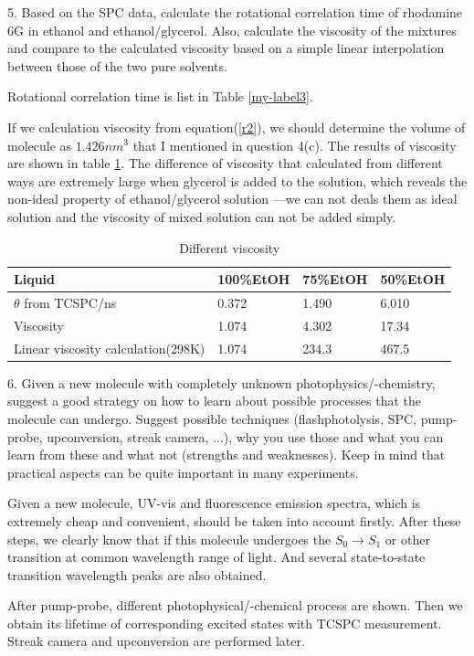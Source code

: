 \documentclass{article}
\begin{document}
5. Based on the SPC data, calculate the rotational correlation time of rhodamine 6G in ethanol and
ethanol/glycerol. Also, calculate the viscosity of the mixtures and compare to the calculated viscosity based on a simple linear interpolation between those of the two pure solvents. \\ \par
Rotational correlation time is list in Table \ref{my-label3}. \par 
If we calculation viscosity from equation(\ref{r2}), we should determine the volume of molecule as $1.426 nm^3$ that I mentioned in question 4(c). The results of viscosity are shown in table 
\ref{my-label4}. The difference of viscosity that calculated from different ways are extremely large when glycerol is added to the solution, which reveals the non-ideal property of ethanol/glycerol solution ---we can not deals them as ideal solution and the viscosity of mixed solution can not be added simply. \\ \par

\begin{table}
\centering
\caption{Different viscosity}
\label{my-label4}
\begin{tabular}{@{}llll@{}}
\toprule
Liquid & 100\%EtOH & 75\%EtOH &50\%EtOH\\ \midrule
$\theta$ from TCSPC/ns  & 0.372 & 1.490 &6.010\\ 
Viscosity  & 1.074 & 4.302 &17.34\\ 
Linear viscosity calculation(298K)  & 1.074 & 234.3 &467.5\\ 
\bottomrule
\end{tabular}
\end{table}


6.  Given a new molecule with completely unknown photophysics/-chemistry, suggest a good strategy on
how to learn about possible processes that the molecule can undergo. Suggest possible techniques (flashphotolysis,
SPC, pump-probe, upconversion, streak camera, ...), why you use those and what you can
learn from these and what not (strengths and weaknesses). Keep in mind that practical aspects can be
quite important in many experiments. \\ \par


Given a new molecule, UV-vis and fluorescence emission spectra, which is extremely cheap and convenient, should be taken into account firstly. After these steps, we clearly know that if this molecule undergoes the $S_0 \rightarrow S_1$ or other transition at common wavelength range of light. And several state-to-state transition wavelength peaks are also obtained.\par 
After pump-probe, different photophysical/-chemical process are shown.  Then we obtain its lifetime of corresponding excited states with TCSPC measurement. Streak camera and upconversion are performed later.\\ \par
\end{document}
